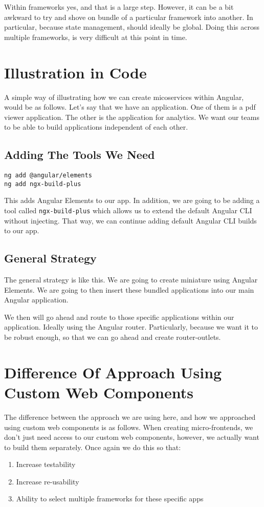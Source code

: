 Within frameworks yes, and that is a large step. However, it can be a bit awkward to try and shove on bundle of a particular framework into another. In particular, because state management, should ideally be global. Doing this across multiple frameworks, is very difficult at this point in time. 

\section{Illustration in Code}
A simple way of illustrating how we can create micoservices within Angular, would be as follows. Let's say that we have an application. One of them is a pdf viewer application. The other is the application for analytics. We want our teams to be able to build applications independent of each other. 

\subsection{Adding The Tools We Need}
\begin{verbatim}
ng add @angular/elements
ng add ngx-build-plus
\end{verbatim}

This adds Angular Elements to our app. In addition, we are going to be adding a tool called \lstinline{ngx-build-plus} which allows us to extend the default Angular CLI without injecting. That way, we can continue adding default Angular CLI builds to our app. 

\subsection{General Strategy}
The general strategy is like this. We are going to create miniature using Angular Elements. We are going to then insert these bundled applications into our main Angular application. 

We then will go ahead and route to those specific applications within our application. Ideally using the Angular router. Particularly, because we want it to be robust enough, so that we can go ahead and create router-outlets. 

\section{Difference Of Approach Using Custom Web Components}
The difference between the approach we are using here, and how we approached using custom web components is as follows. When creating micro-frontends, we don't just need access to our custom web components, however, we actually want to build them separately. Once again we do this so that: 
\begin{enumerate}
  \item Increase testability
  \item Increase re-usability
  \item Ability to select multiple frameworks for these specific apps
\end{enumerate}

